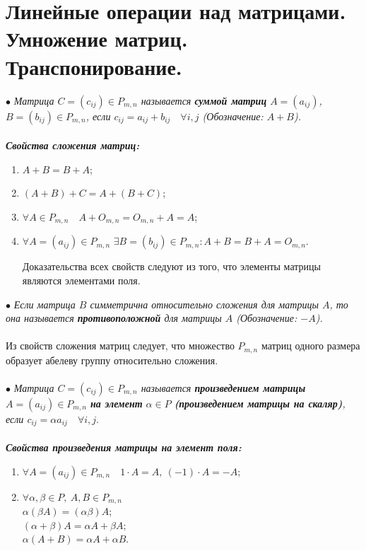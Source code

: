 \section{Линейные операции над матрицами. Умножение матриц. Транспонирование.}
$\bullet$\textit{ Матрица $C = (c_{ij}) \in P_{m,n}$ называется \textbf{суммой матриц} $A = (a_{ij})$, $B = (b_{ij}) \in P_{m,n}$, если $c_{ij} = a_{ij} + b_{ij}\quad \forall i,j$ (Обозначение: $A+B$).}\\\\
\textit{\textbf{Свойства сложения матриц:}}\begin{enumerate}
	\item $A + B = B + A$;
	\item $(A+B) + C = A + (B+C)$;
	\item $\forall A \in P_{m,n}\quad A + O_{m,n} = O_{m,n} + A = A$;
	\item $\forall A = (a_{ij}) \in P_{m,n}$ $\exists B = (b_{ij}) \in P_{m,n} : A + B = B+ A = O_{m,n}$.
	\begin{Proof}
		Доказательства всех свойств следуют из того, что элементы матрицы являются элементами поля.
	\end{Proof}
\end{enumerate}
$\bullet$\textit{ Если матрица $B$ симметрична относительно сложения для матрицы $A$, то она называется \textbf{противоположной} для матрицы $A$ (Обозначение: $-A$).}\\\\
Из свойств сложения матриц следует, что множество $P_{m,n}$ матриц одного размера образует абелеву группу относительно сложения.\\\\
$\bullet$ \textit{Матрица $C = (c_{ij}) \in P_{m,n}$ называется \textbf{произведением матрицы} $A = (a_{ij}) \in P_{m,n}$ \textbf{на элемент} $\alpha \in P$\textbf{ (произведением матрицы на скаляр)}, если $c_{ij} = \alpha a_{ij}\quad\forall i,j$}.\\\\
\textbf{\textit{Свойства произведения матрицы на элемент поля:}}\begin{enumerate}
	\item $\forall A = (a_{ij}) \in P_{m,n}\quad 1\cdot A = A,\ (-1)\cdot A = -A$;
	\item $\forall \alpha, \beta \in P,\ A,B\in P_{m,n}$\\
	$\alpha(\beta A) = (\alpha\beta)A$;\\
	$(\alpha + \beta) A = \alpha A + \beta A$;\\
	$\alpha (A+B) = \alpha A + \alpha B$.
\end{enumerate}
